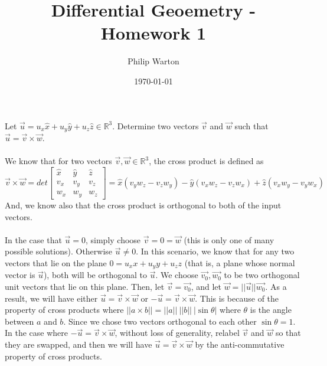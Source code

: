 \documentclass{article}
\theoremstyle{definition}
\begin{document}
\title{Differential Geoemetry - Homework 1}
\author{Philip Warton}
\date{\today}
\maketitle
Let $\vec{u} = u_x \hat{x} + u_y \hat{y} + u_z \hat{z} \in \mathbb{R}^3$. Determine two vectors
$\vec{v}$ and $\vec{w}$ such that $\vec{u} = \vec{v} \times \vec{w}$.\\\\

We know that for two vectors $\vec{v}, \vec{w} \in \mathbb{R}^3$, the cross product is defined as
\[
    \vec{v} \times \vec{w} = det\begin{bmatrix}
        \hat{x}&\hat{y}&\hat{z}\\
        v_x&v_y&v_z\\
        w_x&w_y&w_z
    \end{bmatrix} = \hat{x}(v_yw_z - v_zw_y) - \hat{y}(v_xw_z - v_zw_x) + \hat{z}(v_xw_y - v_yw_x)
\]
And, we know also that the cross product is orthogonal to both of the input vectors.
\\\\
In the case that $\vec{u} = 0$, simply choose $\vec{v} = 0 = \vec{w}$ (this is only one of many possible solutions).
Otherwise $\vec{u} \neq 0$. In this scenario, we know that for any two vectors that lie on the plane $0 = u_x x + u_y y + u_z z$
(that is, a plane whose normal vector is $\vec{u}$),
both will be orthogonal to $\vec{u}$. We choose $\vec{v_0}, \vec{w_0}$ to be two orthogonal unit vectors that lie on this plane. Then,
let $\vec{v} = \vec{v_0}$, and let $\vec{w} = ||\vec{u}|| \vec{w_0}$. As a result, we will have either $\vec{u} = \vec{v} \times \vec{w}$ or 
$-\vec{u} = \vec{v} \times \vec{w}$. This is because of the property of cross products where $||a \times b|| = ||a|| \ ||b|| 
\ |\sin \theta|$ where $\theta$
is the angle between $a$ and $b$. Since we chose two vectors orthogonal to each other $\sin \theta = 1$. In the case where $-\vec{u} = \vec{v} \times \vec{w}$, without loss of generality, relabel $\vec{v}$ and $\vec{w}$ so that they are swapped,
and then we will have $\vec{u} = \vec{v} \times \vec{w}$ by the anti-commutative property of cross products.
\end{document}
